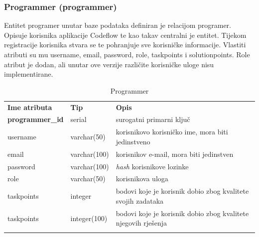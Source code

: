 \documentclass[times, utf8, zavrsni]{fer}
\begin{document}
		
		\subsubsection{Programmer (programmer)}
		Entitet programer unutar baze podataka definiran je relacijom programer. Opisuje korisnika aplikacije Codeflow te kao takav centralni je entitet. Tijekom registracije korisnika stvara se te pohranjuje sve korisničke informacije. Vlastiti atributi su mu username, email, password, role, taskpoints i solutionpoints. Role atribut je dodan, ali unutar ove verzije različite korisničke uloge nisu implementirane.
		\begin{table}[H]
			\caption{Programmer}
			\label{tbl:programmer}
			\centering
			\begin{tabu} to \textwidth {XXX}
				\tabucline[1.75pt]{-}
				\textbf{Ime atributa} & \textbf{Tip} & \textbf{Opis}\\ 				
				\tabucline[1pt]{-}
				\textbf{programmer\_id} & serial & surogatni primarni ključ\\ \hline
				username & varchar(50) & korisnikovo korisničko ime, mora biti jedinstveno\\ \hline
				email & varchar(100) & korisnikov e-mail, mora biti jedinstven\\ \hline
				password & varchar(100) & \textit{hash} korisnikove lozinke\\ \hline
				role & varchar(50) & korisnikova uloga\\ \hline
				taskpoints & integer & bodovi koje je korisnik dobio zbog kvalitete svojih zadataka\\ \hline
				taskpoints & integer(100) &  bodovi koje je korisnik dobio zbog kvalitete njegovih rješenja\\
				\tabucline[1.75pt]{-}
			\end{tabu}
		\end{table}
		
\end{document}
